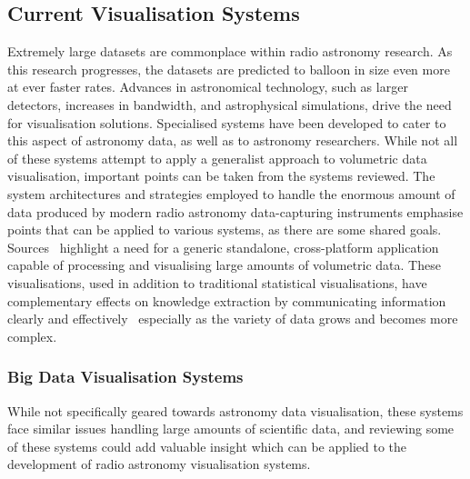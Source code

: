 \subsection{Current Visualisation Systems}
\label{sec:current-systems}
Extremely large datasets are commonplace within radio astronomy research. 
As this research progresses, the datasets are predicted to balloon in size even more at ever faster rates.
Advances in astronomical technology, such as larger detectors, increases in bandwidth, and astrophysical simulations, drive the need for visualisation solutions.
Specialised systems have been developed to cater to this aspect of astronomy data, as well as to astronomy researchers. 
While not all of these systems attempt to apply a generalist approach to volumetric data visualisation, important points can be taken from the systems reviewed.
The system architectures and strategies employed to handle the enormous amount of data produced by modern radio astronomy data-capturing instruments emphasise points that can be applied to various systems, as there are some shared goals.
Sources~\cite{Ferrand2016, Hassan2011, Naiman2016, Kent2013, Shneiderman2008} highlight a need for a generic standalone, cross-platform application capable of processing and visualising large amounts of volumetric data. 
These visualisations, used in addition to traditional statistical visualisations, have complementary effects on knowledge extraction by communicating information clearly and effectively~\cite{Caldarola2017, Goodman2012, Naiman2016, Rosenblum1994} especially as the variety of data grows and becomes more complex.

\subsubsection{Big Data Visualisation Systems}
While not specifically geared towards astronomy data visualisation, these systems face similar issues handling large amounts of scientific data, and reviewing some of these systems could add valuable insight which can be applied to the development of radio astronomy visualisation systems.

